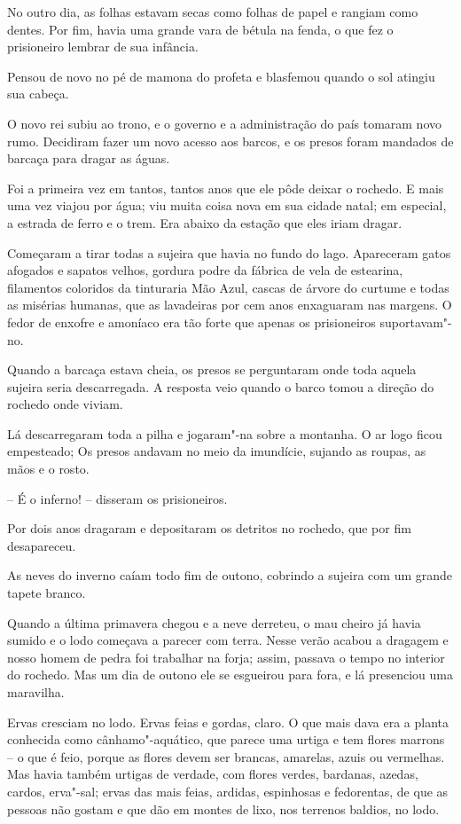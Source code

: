 No outro dia, as folhas estavam secas como folhas de papel e rangiam
como dentes. Por fim, havia uma grande vara de bétula na fenda, o que
fez o prisioneiro lembrar de sua infância.

Pensou de novo no pé de mamona do profeta e blasfemou quando o sol
atingiu sua cabeça.
\asterisc

O novo rei subiu ao trono, e o governo e a administração do país tomaram
novo rumo. Decidiram fazer um novo acesso aos barcos, e os presos foram
mandados de barcaça para dragar as águas.

Foi a primeira vez em tantos, tantos anos que ele pôde deixar o rochedo.
E mais uma vez viajou por água; viu muita coisa nova em sua cidade
natal; em especial, a estrada de ferro e o trem. Era abaixo da estação
que eles iriam dragar.

Começaram a tirar todas a sujeira que havia no fundo do lago. Apareceram
gatos afogados e sapatos velhos, gordura podre da fábrica de vela de
estearina, filamentos coloridos da tinturaria Mão Azul, cascas de
árvore do curtume e todas as misérias humanas, que as lavadeiras por
cem anos enxaguaram nas margens. O fedor de enxofre e amoníaco era tão
forte que apenas os prisioneiros suportavam"-no.\label{lago}

Quando a barcaça estava cheia, os presos se perguntaram onde toda aquela
sujeira seria descarregada. A resposta veio quando o barco tomou a
direção do rochedo onde viviam.

Lá descarregaram toda a pilha e jogaram"-na sobre a montanha. O ar logo
ficou empesteado; Os presos andavam no meio da imundície, sujando as
roupas, as mãos e o rosto.

-- É o inferno! -- disseram os prisioneiros.

Por dois anos dragaram e depositaram os detritos no rochedo, que por fim
desapareceu.

As neves do inverno caíam todo fim de outono, cobrindo a sujeira com um
grande tapete branco.

Quando a última primavera chegou e a neve derreteu, o mau cheiro já
havia sumido e o lodo começava a parecer com terra. Nesse verão acabou
a dragagem e nosso homem de pedra foi trabalhar na forja; assim,
passava o tempo no interior do rochedo. Mas um dia de outono ele se
esgueirou para fora, e lá presenciou uma maravilha.

Ervas cresciam no lodo. Ervas feias e gordas, claro. O que mais dava era
a planta conhecida como cânhamo"-aquático, que parece uma urtiga e tem
flores marrons -- o que é feio, porque as flores devem ser brancas,
amarelas, azuis ou vermelhas. Mas havia também urtigas de verdade, com
flores verdes, bardanas, azedas, cardos, erva"-sal; ervas das mais
feias, ardidas, espinhosas e fedorentas, de que as pessoas não gostam e
que dão em montes de lixo, nos terrenos baldios, no lodo.

